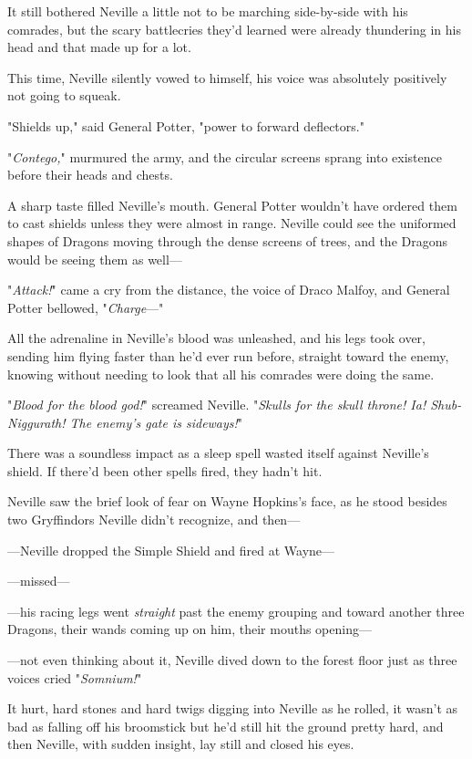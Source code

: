 It still bothered Neville a little not to be marching side-by-side with his
comrades, but the scary battlecries they'd learned were already thundering in
his head and that made up for a lot.

This time, Neville silently vowed to himself, his voice was absolutely
positively not going to squeak.

"Shields up," said General Potter, "power to forward deflectors."

"\emph{Contego,}" murmured the army, and the circular screens sprang into
existence before their heads and chests.

A sharp taste filled Neville's mouth. General Potter wouldn't have ordered them
to cast shields unless they were almost in range. Neville could see the
uniformed shapes of Dragons moving through the dense screens of trees, and the
Dragons would be seeing them as well---

"\emph{Attack!}" came a cry from the distance, the voice of Draco Malfoy, and
General Potter bellowed, "\emph{Charge}\mbox{---}"

All the adrenaline in Neville's blood was unleashed, and his legs took over,
sending him flying faster than he'd ever run before, straight toward the enemy,
knowing without needing to look that all his comrades were doing the same.

"\emph{Blood for the blood god!}" screamed Neville. "\emph{Skulls for the skull
throne! Ia! Shub-Niggurath! The enemy's gate is sideways!}"

There was a soundless impact as a sleep spell wasted itself against Neville's
shield. If there'd been other spells fired, they hadn't hit.

Neville saw the brief look of fear on Wayne Hopkins's face, as he stood besides
two Gryffindors Neville didn't recognize, and then---

---Neville dropped the Simple Shield and fired at Wayne---

---missed---

---his racing legs went \emph{straight} past the enemy grouping and toward
another three Dragons, their wands coming up on him, their mouths opening---

---not even thinking about it, Neville dived down to the forest floor just as
three voices cried "\emph{Somnium!}"

It hurt, hard stones and hard twigs digging into Neville as he rolled, it
wasn't as bad as falling off his broomstick but he'd still hit the ground
pretty hard, and then Neville, with sudden insight, lay still and closed his
eyes.

